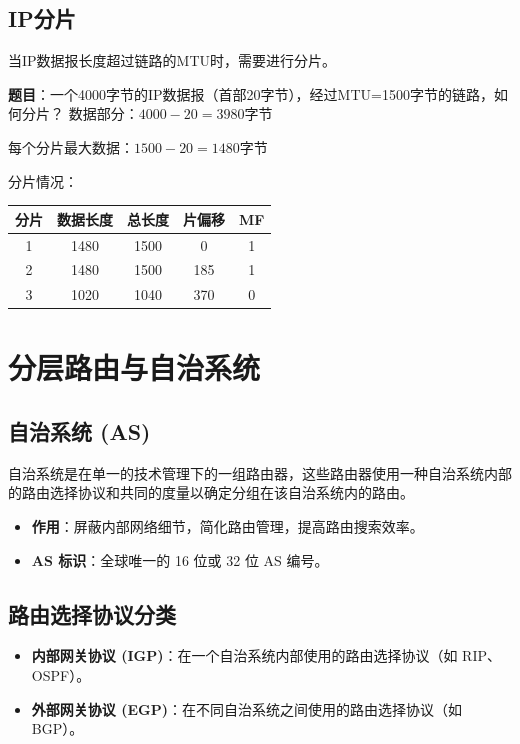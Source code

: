 \subsection{IP分片}
当IP数据报长度超过链路的MTU时，需要进行分片。

\begin{examplebox}[例题4.5 IP分片]
\textbf{题目}：一个4000字节的IP数据报（首部20字节），经过MTU=1500字节的链路，如何分片？
\tcblower
数据部分：$4000 - 20 = 3980$字节

每个分片最大数据：$1500 - 20 = 1480$字节

分片情况：
\begin{center}\small
\begin{tabular}{|c|c|c|c|c|}
\hline
分片 & 数据长度 & 总长度 & 片偏移 & MF \\
\hline
1 & 1480 & 1500 & 0 & 1 \\
2 & 1480 & 1500 & 185 & 1 \\
3 & 1020 & 1040 & 370 & 0 \\
\hline
\end{tabular}
\end{center}
\end{examplebox}

\section{分层路由与自治系统}
\subsection{自治系统 (AS)}
自治系统是在单一的技术管理下的一组路由器，这些路由器使用一种自治系统内部的路由选择协议和共同的度量以确定分组在该自治系统内的路由。
\begin{itemize}[leftmargin=2em,itemsep=0pt]
    \item \textbf{作用}：屏蔽内部网络细节，简化路由管理，提高路由搜索效率。
    \item \textbf{AS 标识}：全球唯一的 16 位或 32 位 AS 编号。
\end{itemize}

\subsection{路由选择协议分类}
\begin{itemize}[leftmargin=2em,itemsep=0pt]
    \item \textbf{内部网关协议 (IGP)}：在一个自治系统内部使用的路由选择协议（如 RIP、OSPF）。
    \item \textbf{外部网关协议 (EGP)}：在不同自治系统之间使用的路由选择协议（如 BGP）。
\end{itemize}


